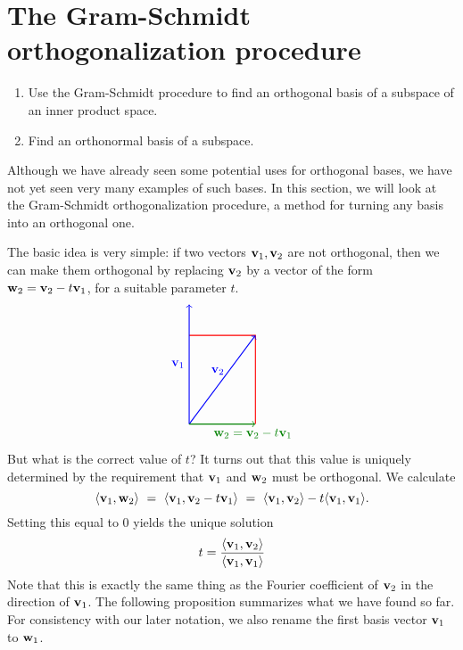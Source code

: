\section{The Gram-Schmidt orthogonalization procedure}
\label{sec:gram-schmidt}

\begin{outcome}
  \begin{enumerate}
  \item Use the Gram-Schmidt procedure to find an orthogonal basis
    of a subspace of an inner product space.
  \item Find an orthonormal basis of a subspace.
  \end{enumerate}
\end{outcome}

Although we have already seen some potential uses for orthogonal
bases, we have not yet seen very many examples of such bases. In this
section, we will look at the Gram-Schmidt orthogonalization procedure,
a method for turning any basis into an orthogonal one.

The basic idea is very simple: if two vectors $\vect{v}_1,\vect{v}_2$
are not orthogonal, then we can make them orthogonal by replacing
$\vect{v}_2$ by a vector of the form $\vect{w}_2 = \vect{v}_2 -
t\vect{v}_1$, for a suitable parameter $t$.
\begin{equation*}
  \begin{tikzpicture}[scale=1.25]
    \draw[thick,red] (1.5,0) -- (1.5,2) -- (0,2);
    \draw[thick,blue,->] (0,0) -- node[left]{$\vect{v}_1$} (0,2.7);
    \draw[thick,blue,->] (0,0) -- node[left, pos=0.6]{$\vect{v}_2$} (1.5,2);
    \draw[thick,green!50!black,->] (0,0) -- node[below right, pos=0.3]{$\vect{w}_2 = \vect{v}_2 - t\vect{v}_1$} (1.5,0);
  \end{tikzpicture}
\end{equation*}
But what is the correct value of $t$? It turns out that this value is
uniquely determined by the requirement that $\vect{v}_1$ and
$\vect{w}_2$ must be orthogonal. We calculate
\begin{equation*}
  \iprod{\vect{v}_1,\vect{w}_2}
  ~=~ \iprod{\vect{v}_1,\vect{v}_2-t\vect{v}_1}
  ~=~ \iprod{\vect{v}_1,\vect{v}_2}-t\iprod{\vect{v}_1,\vect{v}_1}.
\end{equation*}
Setting this equal to $0$ yields the unique solution
\begin{equation*}
  t = \frac{\iprod{\vect{v}_1,\vect{v}_2}}{\iprod{\vect{v}_1,\vect{v}_1}}
\end{equation*}
Note that this is exactly the same thing as the Fourier coefficient of
$\vect{v}_2$ in the direction of $\vect{v}_1$. The following
proposition summarizes what we have found so far. For consistency with
our later notation, we also rename the first basis vector $\vect{v}_1$
to $\vect{w}_1$.

